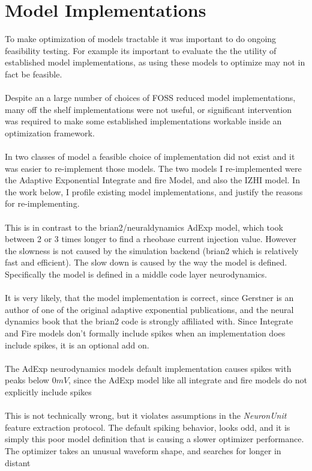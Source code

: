 
    

 \section{Model Implementations}   
To make optimization of models tractable it was important to do ongoing feasibility testing. For example its important to evaluate the the utility of established model implementations, as using these models to optimize may not in fact be feasible.\\ 
\\
Despite an a large number of choices of FOSS reduced model
implementations, many off the shelf implementations were not useful, or significant intervention was required to make some established implementations workable inside an optimization framework. \\
\\
In two classes of model a feasible choice of implementation did not exist and it was easier to re-implement those models. The two models I re-implemented were
the Adaptive Exponential Integrate and fire Model, and also the IZHI
model.  In the work below, I profile existing model implementations, and
justify the reasons for re-implementing.\\
\\
This is in contrast to the brian2/neuraldynamics AdExp model, which took
between 2 or 3 times longer to find a rheobase current injection value. However the slowness is not caused by the simulation backend (brian2 which is relatively fast and efficient). The slow down is caused by the way the model is defined. Specifically the
model is defined in a middle code layer neurodynamics\cite{gerstner2014neuronal}.\\
\\
It is very likely, that the model implementation is correct, since Gerstner is an author of one of the original adaptive exponential publications, and the neural dynamics book that the brian2 code is strongly affiliated with. Since Integrate and Fire models don't formally include spikes when an implementation does include spikes, it is an optional add on.\\
\\
The AdExp neurodynamics models default implementation causes spikes with peaks below $0mV$, since the AdExp model like all integrate and fire models do not explicitly include spikes\\
\\
This is not technically wrong, but it violates
assumptions in the \emph{NeuronUnit} feature extraction protocol. The default spiking behavior, looks odd, and it is simply this poor model definition that is causing a slower optimizer performance. The optimizer takes an unusual waveform shape, and searches for longer in distant
